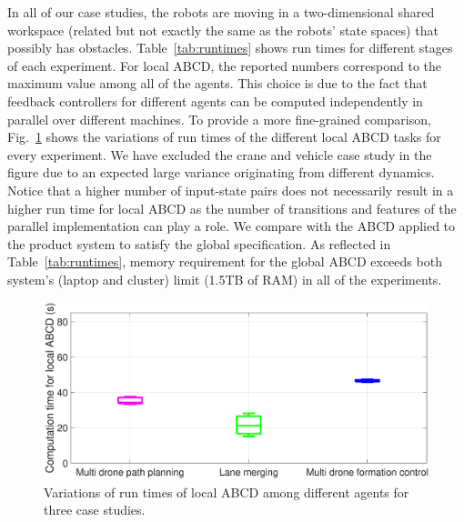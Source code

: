 In all of our case studies, the robots are moving in a two-dimensional shared workspace (related but not exactly the same as the robots' state spaces) that possibly has obstacles. 
Table~\ref{tab:runtimes} shows run times for different stages of each experiment. 
For local ABCD, the reported numbers correspond to the maximum value among all of the agents. 
This choice is due to the fact that feedback controllers for different agents can be computed independently 
in parallel over different machines. 
To provide a more fine-grained comparison,
Fig.~\ref{fig:box_plot} shows the variations of run times of the different local ABCD tasks for every experiment. 
We have excluded the crane and vehicle case study in the figure due to an expected large variance originating from different dynamics. 
Notice that a higher number of input-state pairs does not necessarily result in a higher run time for local ABCD as the 
number of transitions and features of the parallel implementation can play a role. 
%
We compare \tool with the ABCD applied to the product system to satisfy the global specification. 
As reflected in Table~\ref{tab:runtimes}, memory requirement for the global ABCD exceeds both system's (laptop and cluster) limit (1.5TB of RAM) in all of the experiments.
%
%
\begin{figure}[t]
	\centering
	\includegraphics[width=\columnwidth]{figures/final_box_plot.eps}
	\caption{Variations of run times of local ABCD among different agents for three case studies.}
	\label{fig:box_plot}
	\vspace{-.3cm}
\end{figure}

